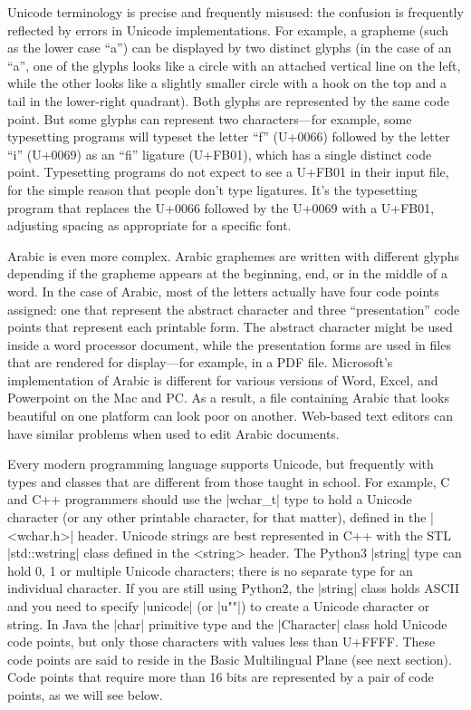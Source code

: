 Unicode terminology is precise and frequently misused: the confusion
is frequently reflected by errors in Unicode implementations. For
example, a grapheme (such as the lower case ``a'') can be displayed by
two distinct glyphs (in the case of an ``a'', one of the glyphs looks
like a circle with an attached vertical line on the left, while the
other looks like a slightly smaller circle with a hook on the top and
a tail in the lower-right quadrant).  Both glyphs are represented by
the same code point. But some glyphs can represent two
characters---for example, some typesetting programs will typeset the
letter ``f'' (U+0066) followed by the letter ``i'' (U+0069) as an ``fi''
ligature (U+FB01), which has a single distinct code
point. Typesetting programs do not expect to see a U+FB01 in their
input file, for the simple reason that people don't type
ligatures. It's the typesetting program that replaces the U+0066
followed by the U+0069 with a U+FB01, adjusting spacing as appropriate
for a specific font.

Arabic is even more complex. Arabic graphemes are written with
different glyphs depending if the grapheme appears at the beginning,
end, or in the middle of a word. In the case of Arabic, most of the
letters actually have four code points assigned: one that represent
the abstract character and three ``presentation'' code points that
represent each printable form. The abstract character might be used
inside a word processor document, while the presentation forms are
used in files that are rendered for display---for example, in a PDF
file. Microsoft's implementation of Arabic is different for various
versions of Word, Excel, and Powerpoint on the Mac and PC. As a
result, a file containing Arabic that looks beautiful on one platform
can look poor on another. Web-based text editors can have similar problems when used to edit Arabic documents.

Every modern programming language supports Unicode, but frequently
with types and classes that are different from those taught in
school. For example, C and C++ programmers should use the |wchar_t| type
to hold a Unicode character (or any other printable character, for
that matter), defined in the |<wchar.h>| header. Unicode strings are
best represented in C++ with the STL |std::wstring| class defined in
the <string> header. The Python3 |string| type can hold 0, 1 or
multiple Unicode characters; there is no separate type for an
individual character. If you are still using Python2, the |string|
class holds ASCII and you need to specify |unicode| (or |u""|) to
create a Unicode character or string. In Java the |char| primitive
type and the |Character| class hold Unicode code points, but only
those characters with values less than U+FFFF. These code points are
said to reside in the Basic Multilingual Plane (see next section). Code points that require more than
16 bits are represented by a pair of code points, as we will see
below.

